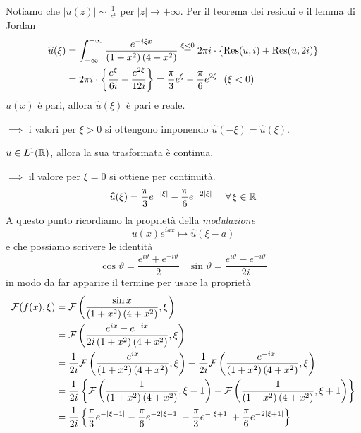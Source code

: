 Notiamo che $| u(z)| \sim \frac{1}{z^{4}}$ per $| z| \rightarrow + \infty $. Per il teorema dei residui e il lemma di Jordan
\begin{equation*}
\begin{aligned}
\hat{u}(\xi) & = \int ^{ + \infty }_{ - \infty }\frac{e^{ - i\xi x}}{\left(1 + x^{2}\right)\left(4 + x^{2}\right)}\overset{\xi < 0}{ = } 2\pi i\cdot \{\Res (u,i) + \Res (u,2i)\}\\
 & = 2\pi i\cdot \left\{\frac{e^{\xi }}{6i} - \frac{e^{2\xi }}{12i}\right\} = \frac{\pi }{3} e^{\xi } - \frac{\pi }{6} e^{2\xi } \ \ (\xi < 0)
\end{aligned}
\end{equation*}
$u(x)$ è pari, allora $\hat{u}(\xi)$ è pari e reale.

$\implies $ i valori per $\xi  > 0$ si ottengono imponendo $\hat{u}(- \xi) = \hat{u}(\xi)$.

$u\in L^{1}(\mathbb{R})$, allora la sua trasformata è continua.

$\implies $ il valore per $\xi = 0$ si ottiene per continuità.
\begin{equation*}
\hat{u}(\xi) = \frac{\pi }{3} e^{ - | \xi | } - \frac{\pi }{6} e^{ - 2| \xi | } \ \ \ \ \forall \xi \in \RR 
\end{equation*}
A questo punto ricordiamo la proprietà della \textit{modulazione}
\begin{equation*}
u(x) e^{iax} \mapsto \hat{u}(\xi - a)
\end{equation*}
e che possiamo scrivere le identità
\begin{equation*}
\cos \vartheta = \frac{e^{i\vartheta } + e^{ - i\vartheta }}{2} \ \ \ \ \sin \vartheta = \frac{e^{i\vartheta } - e^{ - i\vartheta }}{2i}
\end{equation*}
in modo da far apparire il termine per usare la proprietà
\begin{equation*}
\begin{aligned}
\mathcal{F} (f(x) ,\xi) & = \mathcal{F} \left(\frac{\sin x}{\left(1 + x^{2}\right)\left(4 + x^{2}\right)} ,\xi \right)\\
 & = \mathcal{F} \left(\frac{e^{ix} - e^{ - ix}}{2i\left(1 + x^{2}\right)\left(4 + x^{2}\right)} ,\xi \right)\\
 & = \frac{1}{2i}\mathcal{F} \left(\frac{e^{ix}}{\left(1 + x^{2}\right)\left(4 + x^{2}\right)} ,\xi \right) + \frac{1}{2i}\mathcal{F} \left(\frac{ - e^{ - ix}}{\left(1 + x^{2}\right)\left(4 + x^{2}\right)} ,\xi \right)\\
 & = \frac{1}{2i}\left\{\mathcal{F} \left(\frac{1}{\left(1 + x^{2}\right)\left(4 + x^{2}\right)} ,\xi - 1\right) - \mathcal{F} \left(\frac{1}{\left(1 + x^{2}\right)\left(4 + x^{2}\right)} ,\xi + 1\right)\right\}\\
 & = \frac{1}{2i}\left\{\frac{\pi }{3} e^{ - | \xi - 1| } - \frac{\pi }{6} e^{ - 2| \xi - 1| } - \frac{\pi }{3} e^{ - | \xi + 1| } + \frac{\pi }{6} e^{ - 2| \xi + 1| }\right\}
\end{aligned}
\end{equation*}
\Soluzione

